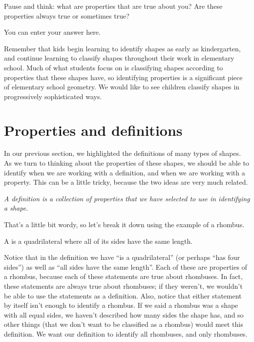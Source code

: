 \documentclass{ximera}
\begin{document}
\begin{question}
Pause and think: what are properties that are true about you? Are these properties always true or sometimes true?
\begin{freeResponse}
You can enter your answer here.
\end{freeResponse}
\end{question}

Remember that kids begin learning to identify shapes as early as kindergarten, and continue learning to classify shapes throughout their work in elementary school. Much of what students focus on is classifying shapes according to properties that these shapes have, so identifying properties is a significant piece of elementary school geometry. We would like to see children classify shapes in progressively sophisticated ways.

\section{Properties and definitions}

In our previous section, we highlighted the definitions of many types of shapes. As we turn to thinking about the properties of these shapes, we should be able to identify when we are working with a definition, and when we are working with a property. This can be a little tricky, because the two ideas are very much related.

\begin{center}
\emph{A definition is a collection of properties that we have selected to use in identifying a shape.}
\end{center}

That's a little bit wordy, so let's break it down using the example of a rhombus.
\begin{definition}
A  is a quadrilateral where all of its sides have the same length. 
\end{definition}
Notice that in the definition we have ``is a quadrilateral'' (or perhaps ``has four sides'') as well as ``all sides have the same length''. Each of these are properties of a rhombus, because each of these statements are true about rhombuses. In fact, these statements are always true about rhombuses; if they weren't, we wouldn't be able to use the statements as a definition. Also, notice that either statement by itself isn't enough to identify a rhombus. If we said a rhombus was a shape with all equal sides, we haven't described how many sides the shape has, and so other things (that we don't want to be classified as a rhombus) would meet this definition. We want our definition to identify all rhombuses, and only rhombuses.
\end{document}
